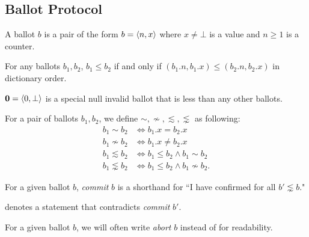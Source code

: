 \newpage
\subsection{Ballot Protocol}

\begin{defn}[Ballot]
    A ballot $b$ is a pair of the form $b = \ev{n, x}$ where $x \ne \bot$ is a value and $n \geq 1$ is a counter.
\end{defn}

\begin{defn}[Order]
    For any ballots $b_1, b_2$, $b_1 \leq b_2$ if and only if $(b_1.n, b_1.x) \leq (b_2.n, b_2.x)$ in dictionary order.
\end{defn}

\begin{defn}
    $\textbf{0} = \ev{0, \bot}$ is a special null invalid ballot that is less than any other ballots.
\end{defn}

\begin{defn}[Compatability]
    For a pair of ballots $b_1, b_2$, we define $\sim, \nsim, \lesssim, \lnsim$ as following:
    \begin{align*}
        b_1 \sim b_2 &\iff b_1.x = b_2.x \\
        b_1 \nsim b_2 &\iff b_1.x \ne b_2.x \\
        b_1 \lesssim b_2 &\iff b_1 \leq b_2 \land b_1 \sim b_2 \\
        b_1 \lnsim b_2 &\iff b_1 \leq b_2 \land b_1 \nsim b_2.
    \end{align*}
\end{defn}

\begin{defn}[Commit]
    For a given ballot $b$, \textit{commit} $b$ is a shorthand for ``I have confirmed  for all $b' \lnsim b$."
\end{defn}

 denotes a statement that contradicts \textit{commit} $b'$.

\begin{rem}[Abort]
    For a given ballot $b$, we will often write \textit{abort} $b$ instead of  for readability.
\end{rem}

